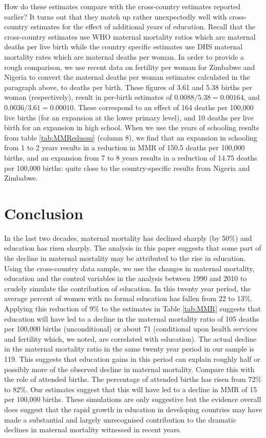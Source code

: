 \documentclass{article}[12pt,subeqn]
\begin{document}
\begin{spacing}{1.4}
How do these estimates compare with the cross-country estimates reported earlier? It turns out that they match up rather 
unexpectedly well with cross-country estimates for the effect of additional years of education. Recall that the cross-country 
estimates use WHO maternal mortality ratios which are maternal deaths per live birth while the country specific estimates use 
DHS maternal mortality rates which are maternal deaths per woman.  In order to provide a rough comparison, we use recent data 
\citep{CIA2012} on fertility per woman for Zimbabwe and Nigeria to convert the maternal deaths per woman estimates calculated 
in the paragraph above, to deaths per birth.  These figures of 3.61 and 5.38 births per woman (respectively), result in per-birth 
estimates of $0.0088/5.38=0.00164$, and $0.0036/3.61=0.00010$.  These correspond to an effect of 164 deaths per 100,000 live 
births (for an expansion at the lower primary level), and 10 deaths per live birth for an expansion in high school.  When we 
use the years of schooling results from table \ref{tab:MMReducsq} (column 8), we find that an expansion in schooling from 1 to 
2 years results in a reduction in MMR of 150.5 deaths per 100,000 births, and an expansion from 7 to 8 years results in a reduction 
of 14.75 deaths per 100,000 births: quite close to the country-specific results from Nigeria and Zimbabwe. 

\section{Conclusion}
In the last two decades, maternal mortality has declined sharply (by 50\%) and education has risen
sharply. The analysis in this paper suggests that some part of the decline in maternal mortality may be
attributed to the rise in education. Using the cross-country data sample, we use the changes in maternal
mortality, education and the control variables in the analysis between 1990 and 2010 to crudely simulate
the contribution of education. In this twenty year period, the average percent of women with no formal
education has fallen from 22 to 13\%. Applying this reduction of 9\% to the estimates in Table \ref{tab:MMR} 
suggests that education will have led to a decline in the maternal mortality ratio of 105 deaths per 100,000 
births (unconditional) or about 71 (conditional upon health services and fertility which, we noted, are 
correlated with education). The actual decline in the maternal mortality ratio in the same twenty year period 
in our sample is 119. This suggests that education gains in this period can explain roughly half or possibly 
more of the observed decline in maternal mortality. Compare this with the role of attended births. The 
percentage of attended births has risen from 72\% to 82\%. Our estimates suggest that this will have led to 
a decline in MMR of 15 per 100,000 births. These simulations are only suggestive but the evidence overall 
does suggest that the rapid growth in education in developing countries may have made a substantial and 
largely unrecognised contribution to the dramatic declines in maternal mortality witnessed in recent years.



\end{spacing}
\end{document}
